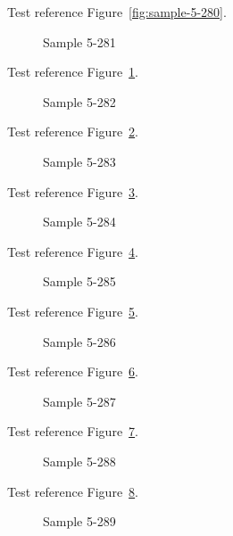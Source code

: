 Test reference Figure~\ref{fig:sample-5-280}.

\begin{figure}[tbhp]
\caption{Sample 5-281}
\label{fig:sample-5-281}
\end{figure}

Test reference Figure~\ref{fig:sample-5-281}.

\begin{figure}[tbhp]
\caption{Sample 5-282}
\label{fig:sample-5-282}
\end{figure}

Test reference Figure~\ref{fig:sample-5-282}.

\begin{figure}[tbhp]
\caption{Sample 5-283}
\label{fig:sample-5-283}
\end{figure}

Test reference Figure~\ref{fig:sample-5-283}.

\begin{figure}[tbhp]
\caption{Sample 5-284}
\label{fig:sample-5-284}
\end{figure}

Test reference Figure~\ref{fig:sample-5-284}.

\begin{figure}[tbhp]
\caption{Sample 5-285}
\label{fig:sample-5-285}
\end{figure}

Test reference Figure~\ref{fig:sample-5-285}.

\begin{figure}[tbhp]
\caption{Sample 5-286}
\label{fig:sample-5-286}
\end{figure}

Test reference Figure~\ref{fig:sample-5-286}.

\begin{figure}[tbhp]
\caption{Sample 5-287}
\label{fig:sample-5-287}
\end{figure}

Test reference Figure~\ref{fig:sample-5-287}.

\begin{figure}[tbhp]
\caption{Sample 5-288}
\label{fig:sample-5-288}
\end{figure}

Test reference Figure~\ref{fig:sample-5-288}.

\begin{figure}[tbhp]
\caption{Sample 5-289}
\label{fig:sample-5-289}
\end{figure}

